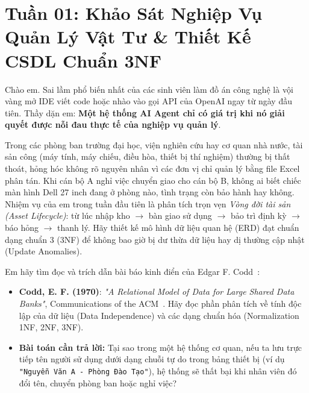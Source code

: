 \section{Tuần 01: Khảo Sát Nghiệp Vụ Quản Lý Vật Tư \& Thiết Kế CSDL Chuẩn 3NF}
\label{sec:tuan_01}

\begin{advisorbox}
Chào em. Sai lầm phổ biến nhất của các sinh viên làm đồ án công nghệ là vội vàng mở IDE viết code hoặc nhào vào gọi API của OpenAI ngay từ ngày đầu tiên. Thầy dặn em: \textbf{Một hệ thống AI Agent chỉ có giá trị khi nó giải quyết được nỗi đau thực tế của nghiệp vụ quản lý}.

Trong các phòng ban trường đại học, viện nghiên cứu hay cơ quan nhà nước, tài sản công (máy tính, máy chiếu, điều hòa, thiết bị thí nghiệm) thường bị thất thoát, hỏng hóc không rõ nguyên nhân vì các đơn vị chỉ quản lý bằng file Excel phân tán. Khi cán bộ A nghỉ việc chuyển giao cho cán bộ B, không ai biết chiếc màn hình Dell 27 inch đang ở phòng nào, tình trạng còn bảo hành hay không. Nhiệm vụ của em trong tuần đầu tiên là phân tích trọn vẹn \textit{Vòng đời tài sản (Asset Lifecycle)}: từ lúc nhập kho $\rightarrow$ bàn giao sử dụng $\rightarrow$ bảo trì định kỳ $\rightarrow$ báo hỏng $\rightarrow$ thanh lý. Hãy thiết kế mô hình dữ liệu quan hệ (ERD) đạt chuẩn dạng chuẩn 3 (3NF) để không bao giờ bị dư thừa dữ liệu hay dị thường cập nhật (Update Anomalies).
\end{advisorbox}

\begin{literaturebox}
Em hãy tìm đọc và trích dẫn bài báo kinh điển của Edgar F. Codd~\cite{codd1970relational}:
\begin{itemize}[leftmargin=1.5em]
    \item \textbf{Codd, E. F. (1970)}: \textit{"A Relational Model of Data for Large Shared Data Banks"}, Communications of the ACM~\cite{codd1970relational}. Hãy đọc phần phân tích về tính độc lập của dữ liệu (Data Independence) và các dạng chuẩn hóa (Normalization 1NF, 2NF, 3NF).
    \item \textbf{Bài toán cần trả lời:} Tại sao trong một hệ thống cơ quan, nếu ta lưu trực tiếp tên người sử dụng dưới dạng chuỗi tự do trong bảng thiết bị (ví dụ \texttt{"Nguyễn Văn A - Phòng Đào Tạo"}), hệ thống sẽ thất bại khi nhân viên đó đổi tên, chuyển phòng ban hoặc nghỉ việc?
\end{itemize}
\end{literaturebox}

